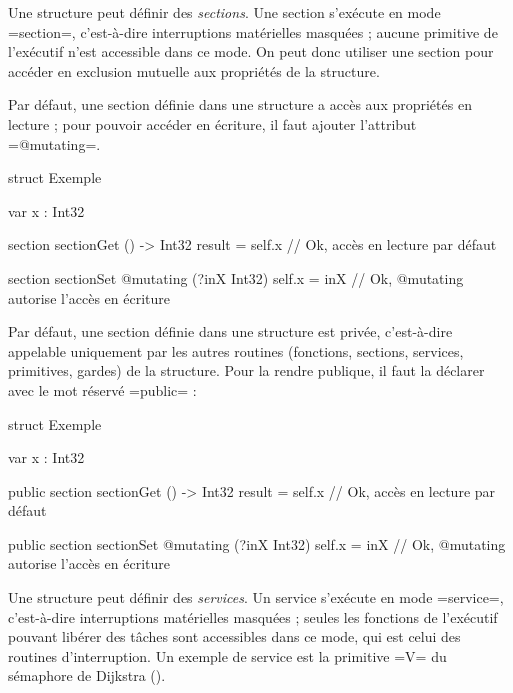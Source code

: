 

Une structure peut définir des \emph{sections}. Une section s'exécute en mode \omnibus=section=, c'est-à-dire interruptions matérielles masquées ; aucune primitive de l'exécutif n'est accessible dans ce mode. On peut donc utiliser une section pour accéder en exclusion mutuelle aux propriétés de la structure.

Par défaut, une section définie dans une structure a accès aux propriétés en lecture ; pour pouvoir accéder en écriture, il faut ajouter l'attribut \omnibus=@mutating=.

\begin{OMNIBUS}
struct Exemple {
  var x : Int32

  section sectionGet () -> Int32 {
    result = self.x // Ok, accès en lecture par défaut
  }

  section sectionSet @mutating (?inX Int32) {
    self.x = inX // Ok, @mutating  autorise l'accès en écriture
  }

}
\end{OMNIBUS}

Par défaut, une section définie dans une structure est privée, c'est-à-dire appelable uniquement par les autres routines (fonctions, sections, services, primitives, gardes) de la structure. Pour la rendre publique, il faut la déclarer avec le mot réservé \omnibus=public= :


\begin{OMNIBUS}
struct Exemple {
  var x : Int32

  public section sectionGet () -> Int32 {
    result = self.x // Ok, accès en lecture par défaut
  }

  public section sectionSet @mutating (?inX Int32) {
    self.x = inX // Ok, @mutating  autorise l'accès en écriture
  }

}
\end{OMNIBUS}








Une structure peut définir des \emph{services}. Un service s'exécute en mode \omnibus=service=, c'est-à-dire interruptions matérielles masquées ; seules les fonctions de l'exécutif pouvant libérer des tâches sont accessibles dans ce mode, qui est celui des routines d'interruption. Un exemple de service est la primitive \omnibus=V= du sémaphore de Dijkstra ().

